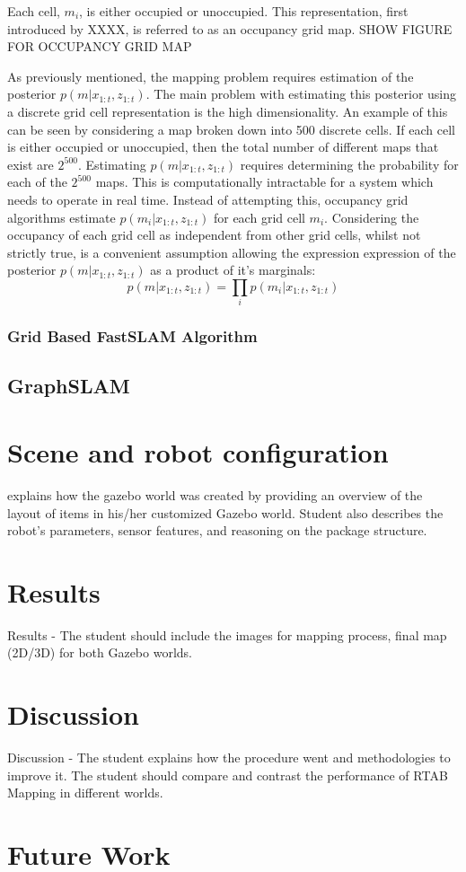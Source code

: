 \documentclass[a4paper]{article}
\begin{document}
Each cell, $m_i$, is either occupied or unoccupied. This representation, first introduced by XXXX, is referred to as an occupancy grid map. SHOW FIGURE FOR OCCUPANCY GRID MAP

As previously mentioned, the mapping problem requires estimation of the posterior $p(m | x_{1:t}, z_{1:t})$. The main problem with estimating this posterior using a discrete grid cell representation is the high dimensionality. An example of this can be seen  by considering a map broken down into 500 discrete cells. If each cell is either occupied or unoccupied, then the total number of different maps that exist are $2^{500}$. Estimating $p(m | x_{1:t}, z_{1:t})$ requires determining the probability for each of the $2^{500}$ maps. This is computationally intractable for a system which needs to operate in real time. Instead of attempting this, occupancy grid algorithms estimate $p(m_i | x_{1:t}, z_{1:t})$ for each grid cell $m_i$. Considering the occupancy of each grid cell as independent from other grid cells, whilst not strictly true, is a convenient assumption allowing the expression expression of the posterior $p(m | x_{1:t}, z_{1:t})$ as a product of it's marginals:
\begin{equation}
p(m | x_{1:t}, z_{1:t}) = \prod_{i} p(m_i | x_{1:t}, z_{1:t})
\end{equation}

\subsubsection{Grid Based FastSLAM Algorithm}


\subsection{GraphSLAM}


\section{Scene and robot configuration}
explains how the gazebo world was created by providing an overview of the layout of items in his/her customized Gazebo world. Student also describes the robot's parameters, sensor features, and reasoning on the package structure.

\section{Results}
Results - The student should include the images for mapping process, final map (2D/3D) for both Gazebo worlds.


\section{Discussion}
Discussion - The student explains how the procedure went and methodologies to improve it. The student should compare and contrast the performance of RTAB Mapping in different worlds.


\section{Future Work}




\end{document}
